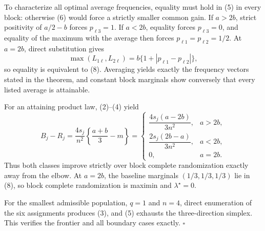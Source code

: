 To characterize all optimal average frequencies, equality must hold in (5) in every block: otherwise (6) would force a strictly smaller common gain. If \(a>2b\), strict positivity of \(a/2-b\) forces \(p_{\ell3}=1\). If \(a<2b\), equality forces \(p_{\ell3}=0\), and equality of the maximum with the average then forces \(p_{\ell1}=p_{\ell2}=1/2\). At \(a=2b\), direct substitution gives
\[
\max(L_{1\ell},L_{2\ell})
=b\{1+|p_{\ell1}-p_{\ell2}|\},
\]
so equality is equivalent to (8). Averaging yields exactly the frequency vectors stated in the theorem, and constant block marginals show conversely that every listed average is attainable.

For an attaining product law, (2)--(4) yield
\[
B_j-R_j
=\frac{4s_j}{n^2}\left\{\frac{a+b}{3}-m\right\}
=
\begin{cases}
\dfrac{4s_j(a-2b)}{3n^2},&a>2b,\\[6pt]
\dfrac{2s_j(2b-a)}{3n^2},&a<2b,\\[6pt]
0,&a=2b.
\end{cases}
\tag{9}
\]
Thus both classes improve strictly over block complete randomization exactly away from the elbow. At \(a=2b\), the baseline marginals \((1/3,1/3,1/3)\) lie in (8), so block complete randomization is maximin and \(\lambda^\star=0\).

For the smallest admissible population, \(q=1\) and \(n=4\), direct enumeration of the six assignments produces (3), and (5) exhausts the three-direction simplex. This verifies the frontier and all boundary cases exactly. \(\square\)